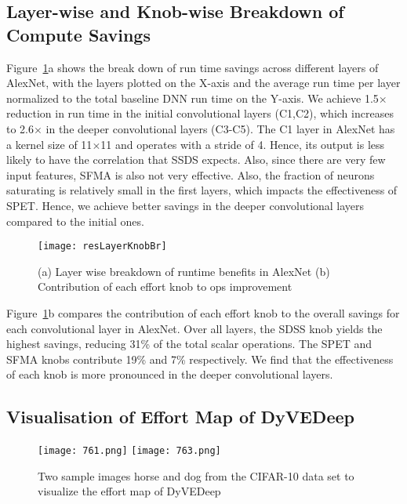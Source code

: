 \documentclass{article} %
\begin{document}
\subsection{Layer-wise and Knob-wise Breakdown of Compute Savings}

Figure~\ref{fig:AlexBreak}a shows the break down of run time savings across different layers of AlexNet, with the layers plotted on the X-axis and the average run time per layer normalized to the total baseline DNN run time on the Y-axis. We achieve 1.5$\times$ reduction in run time in the initial convolutional layers (C1,C2), which increases to 2.6$\times$ in the deeper convolutional layers (C3-C5). The C1 layer in AlexNet has a kernel size of 11$\times$11 and operates with a stride of 4. Hence, its output is less likely to have the correlation that SSDS expects. Also, since there are very few input features, SFMA is also not very effective. Also, the fraction of neurons saturating is relatively small in the first layers, which impacts the effectiveness of SPET. Hence, we achieve better savings in the deeper convolutional layers compared to the initial ones.

\begin{figure}[htb]
\begin{center}
\texttt{[image: resLayerKnobBr]}
\end{center}
\caption{(a) Layer wise breakdown of runtime benefits in AlexNet (b) Contribution of each effort knob to ops improvement}
\label{fig:AlexBreak}
\end{figure}

Figure~\ref{fig:AlexBreak}b compares the contribution of each effort knob to the overall savings for each convolutional layer in AlexNet. Over all layers, the SDSS knob yields the highest savings, reducing 31\% of the total scalar operations. The SPET and SFMA knobs contribute 19\% and 7\% respectively. We find that the effectiveness of each knob is more pronounced in the deeper convolutional layers.

\subsection{Visualisation of Effort Map of DyVEDeep}

\begin{figure}[htb]
\begin{center}
\texttt{[image: 761.png]}
\texttt{[image: 763.png]}
\end{center}
\caption{Two sample images horse and dog from the CIFAR-10 data set to visualize the effort map of DyVEDeep}
\label{fig:horse-dog}
\end{figure}
\end{document}
